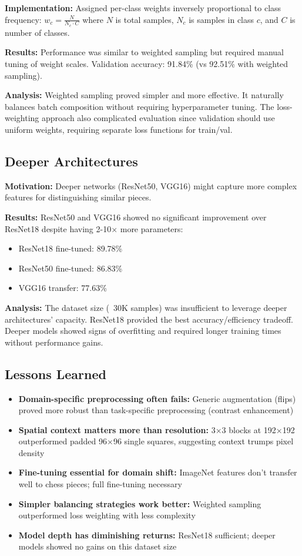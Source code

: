 \documentclass[conference]{IEEEtran}
\begin{document}
\textbf{Implementation:} Assigned per-class weights inversely proportional to class frequency: $w_c = \frac{N}{N_c \cdot C}$ where $N$ is total samples, $N_c$ is samples in class $c$, and $C$ is number of classes.

\textbf{Results:} Performance was similar to weighted sampling but required manual tuning of weight scales. Validation accuracy: 91.84\% (vs 92.51\% with weighted sampling).

\textbf{Analysis:} Weighted sampling proved simpler and more effective. It naturally balances batch composition without requiring hyperparameter tuning. The loss-weighting approach also complicated evaluation since validation should use uniform weights, requiring separate loss functions for train/val.

\subsection{Deeper Architectures}

\textbf{Motivation:} Deeper networks (ResNet50, VGG16) might capture more complex features for distinguishing similar pieces.

\textbf{Results:} ResNet50 and VGG16 showed no significant improvement over ResNet18 despite having 2-10× more parameters:
\begin{itemize}
    \item ResNet18 fine-tuned: 89.78\%
    \item ResNet50 fine-tuned: 86.83\%
    \item VGG16 transfer: 77.63\%
\end{itemize}

\textbf{Analysis:} The dataset size (~30K samples) was insufficient to leverage deeper architectures' capacity. ResNet18 provided the best accuracy/efficiency tradeoff. Deeper models showed signs of overfitting and required longer training times without performance gains.

\subsection{Lessons Learned}

\begin{itemize}
    \item \textbf{Domain-specific preprocessing often fails:} Generic augmentation (flips) proved more robust than task-specific preprocessing (contrast enhancement)
    \item \textbf{Spatial context matters more than resolution:} 3×3 blocks at 192×192 outperformed padded 96×96 single squares, suggesting context trumps pixel density
    \item \textbf{Fine-tuning essential for domain shift:} ImageNet features don't transfer well to chess pieces; full fine-tuning necessary
    \item \textbf{Simpler balancing strategies work better:} Weighted sampling outperformed loss weighting with less complexity
    \item \textbf{Model depth has diminishing returns:} ResNet18 sufficient; deeper models showed no gains on this dataset size
\end{itemize}
\end{document}
